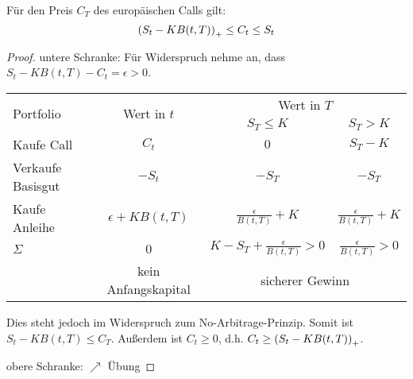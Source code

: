 \begin{lemma} %
	Für den Preis $C_T$ des europäischen Calls gilt:
	\begin{equation*}
		\left( S_t - K B(t,T) \right)_+ \le C_t \le S_t
	\end{equation*}
\end{lemma}
\begin{proof}
	untere Schranke: Für Widerspruch nehme an, dass $S_t - K B(t,T) - C_t = \epsilon > 0$.
	
	\begin{center}
		\begin{tabular}{|l|c|cc|} %
			\hline \multirow{2}{*}{Portfolio} & \multirow{2}{*}{Wert in $t$} & \multicolumn{2}{c|}{Wert in $T$} \\
			&& $S_T \le K$ & $S_T > K$ \\ \hline \hline
			Kaufe Call & $C_t$ & $0$ & $S_T - K$ \\
			Verkaufe Basisgut & $-S_t$ & $-S_T$ & $-S_T$ \\
			Kaufe Anleihe & $\epsilon + K B(t,T)$ & $\frac{\epsilon}{B(t,T)} + K$ &  $\frac{\epsilon}{B(t,T)} + K$ \\ \hline
			$\Sigma$ & $0$ & $K - S_T + \frac{\epsilon}{B(t,T)} > 0$ & $\frac{\epsilon}{B(t,T)} > 0$ \\
			& kein Anfangskapital & \multicolumn{2}{c|}{sicherer Gewinn}\\ \hline
		\end{tabular}
	\end{center}

	Dies steht jedoch im Widerspruch zum No-Arbitrage-Prinzip. Somit ist $S_t - K B(t,T) \le C_T$. Außerdem ist $C_t \ge 0$, d.h. $C_t \ge \left( S_t - K B(t,T) \right)_+$.
	
	obere Schranke: $\nearrow$ Übung
\end{proof}

